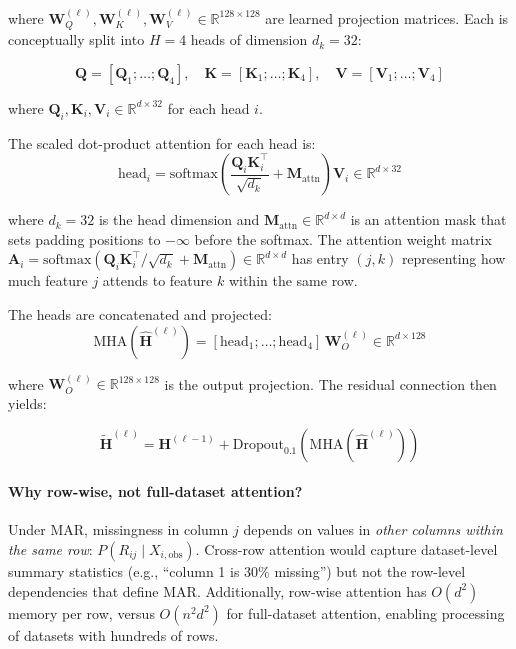 \documentclass[11pt]{article}
\newcommand{\RR}{\mathbb{R}}
\newcommand{\softmax}{\text{softmax}}
\begin{document}
where $\mathbf{W}_Q^{(\ell)}, \mathbf{W}_K^{(\ell)}, \mathbf{W}_V^{(\ell)} \in \RR^{128 \times 128}$ are learned projection matrices. Each is conceptually split into $H = 4$ heads of dimension $d_k = 32$:

\begin{equation}
\mathbf{Q} = [\mathbf{Q}_1; \ldots; \mathbf{Q}_4], \quad
\mathbf{K} = [\mathbf{K}_1; \ldots; \mathbf{K}_4], \quad
\mathbf{V} = [\mathbf{V}_1; \ldots; \mathbf{V}_4]
\end{equation}

where $\mathbf{Q}_i, \mathbf{K}_i, \mathbf{V}_i \in \RR^{d \times 32}$ for each head $i$.

The scaled dot-product attention for each head is:
\begin{equation}
\text{head}_i = \softmax\!\left(\frac{\mathbf{Q}_i \mathbf{K}_i^\top}{\sqrt{d_k}} + \mathbf{M}_{\text{attn}}\right) \mathbf{V}_i \in \RR^{d \times 32}
\label{eq:attention}
\end{equation}

where $d_k = 32$ is the head dimension and $\mathbf{M}_{\text{attn}} \in \RR^{d \times d}$ is an attention mask that sets padding positions to $-\infty$ before the softmax. The attention weight matrix $\mathbf{A}_i = \softmax(\mathbf{Q}_i \mathbf{K}_i^\top / \sqrt{d_k} + \mathbf{M}_{\text{attn}}) \in \RR^{d \times d}$ has entry $(j, k)$ representing how much feature $j$ attends to feature $k$ within the same row.

The heads are concatenated and projected:
\begin{equation}
\text{MHA}(\hat{\mathbf{H}}^{(\ell)}) = [\text{head}_1; \ldots; \text{head}_4] \, \mathbf{W}_O^{(\ell)} \in \RR^{d \times 128}
\label{eq:mha_output}
\end{equation}

where $\mathbf{W}_O^{(\ell)} \in \RR^{128 \times 128}$ is the output projection. The residual connection then yields:

\begin{equation}
\tilde{\mathbf{H}}^{(\ell)} = \mathbf{H}^{(\ell-1)} + \text{Dropout}_{0.1}\!\left(\text{MHA}(\hat{\mathbf{H}}^{(\ell)})\right)
\label{eq:attn_residual}
\end{equation}

\paragraph{Why row-wise, not full-dataset attention?} Under MAR, missingness in column $j$ depends on values in \emph{other columns within the same row}: $P(R_{ij} \mid X_{i, \text{obs}})$. Cross-row attention would capture dataset-level summary statistics (e.g., ``column 1 is 30\% missing'') but not the row-level dependencies that define MAR. Additionally, row-wise attention has $O(d^2)$ memory per row, versus $O(n^2 d^2)$ for full-dataset attention, enabling processing of datasets with hundreds of rows.
\end{document}
